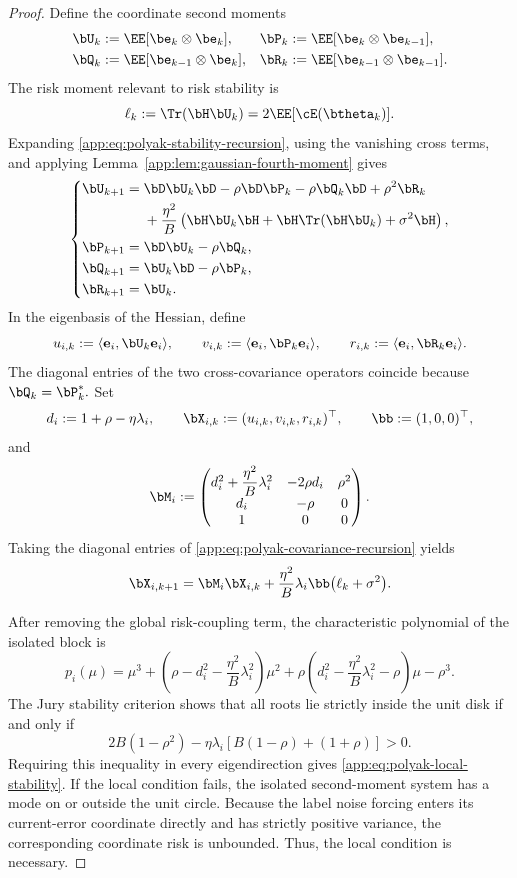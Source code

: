 \documentclass[11pt]{article}
\begin{document}
\begin{proof}
Define the coordinate second moments
\[
\begin{aligned}
\bU_k&:=\EE[\be_k\otimes\be_k],
&
\bP_k&:=\EE[\be_k\otimes\be_{k-1}],
\\
\bQ_k&:=\EE[\be_{k-1}\otimes\be_k],
&
\bR_k&:=\EE[\be_{k-1}\otimes\be_{k-1}].
\end{aligned}
\]
The risk moment relevant to risk stability is
\[
\ell_k
:=
\Tr(\bH\bU_k)
=
2\EE[\cE(\btheta_k)].
\]
Expanding \eqref{app:eq:polyak-stability-recursion}, using the vanishing cross terms, and
applying Lemma~\ref{app:lem:gaussian-fourth-moment} gives
\begin{equation}
\label{app:eq:polyak-covariance-recursion}
\left\{
\begin{aligned}
\bU_{k+1}
={}&
\bD\bU_k\bD
-
\rho\bD\bP_k
-
\rho\bQ_k\bD
+
\rho^2\bR_k
\\
&+
\frac{\eta^2}{B}
\left(
\bH\bU_k\bH
+
\bH\Tr(\bH\bU_k)
+
\sigma^2\bH
\right),
\\
\bP_{k+1}
={}&
\bD\bU_k-\rho\bQ_k,
\\
\bQ_{k+1}
={}&
\bU_k\bD-\rho\bP_k,
\\
\bR_{k+1}
={}&
\bU_k.
\end{aligned}
\right.
\end{equation}
In the eigenbasis of the Hessian, define
\[
u_{i,k}:=\langle\mathbf e_i,\bU_k\mathbf e_i\rangle,
\qquad
v_{i,k}:=\langle\mathbf e_i,\bP_k\mathbf e_i\rangle,
\qquad
r_{i,k}:=\langle\mathbf e_i,\bR_k\mathbf e_i\rangle.
\]
The diagonal entries of the two cross-covariance operators coincide because
\(
\bQ_k=\bP_k^*.
\)
Set
\[
d_i:=1+\rho-\eta\lambda_i,
\qquad
\bX_{i,k}:=(u_{i,k},v_{i,k},r_{i,k})^\top,
\qquad
\bb:=(1,0,0)^\top,
\]
and
\[
\bM_i
:=
\begin{pmatrix}
d_i^2+\dfrac{\eta^2}{B}\lambda_i^2
&
-2\rho d_i
&
\rho^2
\\
d_i
&
-\rho
&
0
\\
1
&
0
&
0
\end{pmatrix}.
\]
Taking the diagonal entries of \eqref{app:eq:polyak-covariance-recursion} yields
\begin{equation}
\label{app:eq:polyak-block-recursion}
\bX_{i,k+1}
=
\bM_i\bX_{i,k}
+
\frac{\eta^2}{B}\lambda_i\bb\bigl(\ell_k+\sigma^2\bigr).
\end{equation}

After removing the global risk-coupling term, the characteristic polynomial of the isolated block
is
\[
p_i(\mu)
=
\mu^3
+
\left(
\rho-d_i^2-\frac{\eta^2}{B}\lambda_i^2
\right)\mu^2
+
\rho
\left(
d_i^2-\frac{\eta^2}{B}\lambda_i^2-\rho
\right)\mu
-
\rho^3.
\]
The Jury stability criterion shows that all roots lie strictly inside the unit disk if and only if
\[
2B(1-\rho^2)
-
\eta\lambda_i\left[B(1-\rho)+(1+\rho)\right]
>0.
\]
Requiring this inequality in every eigendirection gives
\eqref{app:eq:polyak-local-stability}. If the local condition fails, the isolated second-moment
system has a mode on or outside the unit circle.
Because the label noise forcing enters its current-error coordinate directly and has strictly
positive variance, the corresponding coordinate risk is unbounded. Thus, the local condition is
necessary.


\end{proof}
\end{document}

